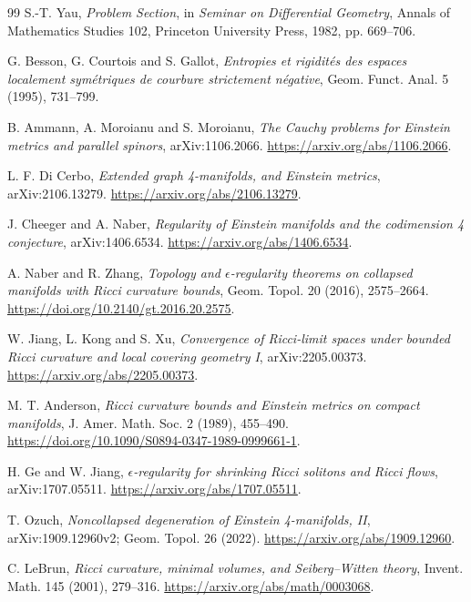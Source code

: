 \documentclass[UTF8,a4paper,11pt,fontset=fandol]{ctexart}
\numberwithin{equation}{section}
\theoremstyle{definition}
\begin{document}
\begin{thebibliography}{99}
 S.-T. Yau, \emph{Problem Section}, in \emph{Seminar on Differential Geometry}, Annals of Mathematics Studies 102, Princeton University Press, 1982, pp. 669--706.

 G. Besson, G. Courtois and S. Gallot,
\emph{Entropies et rigidités des espaces localement symétriques de courbure strictement négative},
Geom. Funct. Anal. 5 (1995), 731--799.

 B. Ammann, A. Moroianu and S. Moroianu,
\emph{The Cauchy problems for Einstein metrics and parallel spinors},
arXiv:1106.2066. \url{https://arxiv.org/abs/1106.2066}.

 L. F. Di Cerbo, \emph{Extended graph 4-manifolds, and Einstein metrics}, arXiv:2106.13279. \url{https://arxiv.org/abs/2106.13279}.

 J. Cheeger and A. Naber, \emph{Regularity of Einstein manifolds and the codimension 4 conjecture}, arXiv:1406.6534. \url{https://arxiv.org/abs/1406.6534}.

 A. Naber and R. Zhang, \emph{Topology and $\epsilon$-regularity theorems on collapsed manifolds with Ricci curvature bounds}, Geom. Topol. 20 (2016), 2575--2664. \url{https://doi.org/10.2140/gt.2016.20.2575}.

 W. Jiang, L. Kong and S. Xu, \emph{Convergence of Ricci-limit spaces under bounded Ricci curvature and local covering geometry I}, arXiv:2205.00373. \url{https://arxiv.org/abs/2205.00373}.

 M. T. Anderson, \emph{Ricci curvature bounds and Einstein metrics on compact manifolds}, J. Amer. Math. Soc. 2 (1989), 455--490. \url{https://doi.org/10.1090/S0894-0347-1989-0999661-1}.

 H. Ge and W. Jiang, \emph{$\epsilon$-regularity for shrinking Ricci solitons and Ricci flows}, arXiv:1707.05511. \url{https://arxiv.org/abs/1707.05511}.

 T. Ozuch, \emph{Noncollapsed degeneration of Einstein 4-manifolds, II}, arXiv:1909.12960v2; Geom. Topol. 26 (2022). \url{https://arxiv.org/abs/1909.12960}.

 C. LeBrun, \emph{Ricci curvature, minimal volumes, and Seiberg--Witten theory}, Invent. Math. 145 (2001), 279--316. \url{https://arxiv.org/abs/math/0003068}.

\end{thebibliography}
\end{document}
